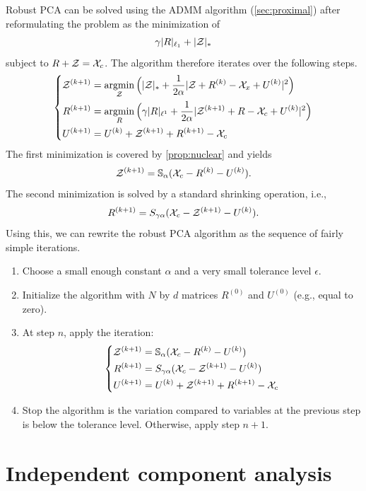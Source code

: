 Robust PCA can be solved using the ADMM algorithm (\cref{sec:proximal}) after reformulating the problem as the minimization of 
\[
\gamma |R|_{\ell_1} +  |{\mathcal Z}|_*
\]
subject to $R + {\mathcal Z} = {\mathcal X}_c$.  The algorithm therefore iterates over the following steps.
\begin{equation}
\label{eq:pcp}
\left\{
\begin{aligned}
{\mathcal Z}^{(k+1)} &=  \operatorname*{argmin}_{\mathcal Z} \Big( |{\mathcal Z}|_* + \frac{1}{2\alpha} |{\mathcal Z} + R^{(k)} - {\mathcal X}_x + U^{(k)}|^2\Big)\\
R^{(k+1)} &= \operatorname*{argmin}_R \Big(\gamma |R|_{\ell^1} + \frac1{2\alpha} |{\mathcal Z}^{(k+1)} + R - {\mathcal X}_c + U^{(k)}|^2\Big) \\
U^{(k+1)} &= U^{(k)} + {\mathcal Z}^{(k+1)} + R^{(k+1)} - {\mathcal X}_c
\end{aligned}
\right.
\end{equation} 
The first minimization is covered by  \cref{prop:nuclear} and yields
\[
{\mathcal Z}^{(k+1)} = {\mathbb S}_\alpha({\mathcal X}_c - R^{(k)} - U^{(k)}).
\]
The second minimization is solved by a standard shrinking operation, i.e., 
\[
R^{(k+1)} = S_{\gamma\alpha} ({\mathcal X}_c - {\mathcal Z}^{(k+1)} - U^{(k)}). 
\]
Using this, we can rewrite the robust PCA algorithm as the sequence of fairly simple iterations.
\begin{algorithm}
\label{alg:robust.pca}
\begin{enumerate}
\item Choose a small enough constant $\alpha$ and a very small tolerance level $\epsilon$.
\item Initialize the algorithm with $N$ by $d$ matrices $R^{(0)}$ and $U^{(0)}$ (e.g., equal to zero).
\item At step $n$, apply the iteration: 
\begin{equation}
\label{eq:pcp.2}
\left\{
\begin{aligned}
{\mathcal Z}^{(k+1)} &= {\mathbb S}_\alpha({\mathcal X}_c - R^{(k)} - U^{(k)}) \\
R^{(k+1)} &=S_{\gamma\alpha} ({\mathcal X}_c - {\mathcal Z}^{(k+1)} - U^{(k)}) \\
U^{(k+1)} &= U^{(k)} + {\mathcal Z}^{(k+1)} + R^{(k+1)} - {\mathcal X}_c
\end{aligned}
\right.
\end{equation} 
\item Stop the algorithm is the variation compared to variables at the previous step is below the tolerance level. Otherwise, apply step $n+1$.
\end{enumerate}
\end{algorithm}


\section{Independent component analysis}


